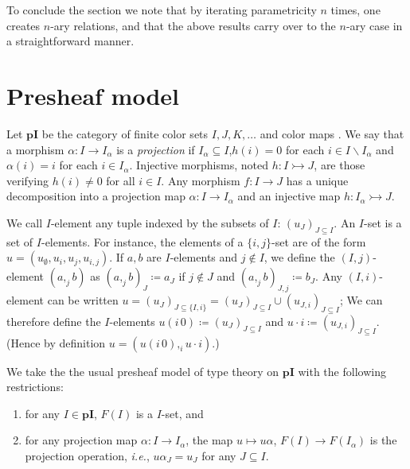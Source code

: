 \documentclass[english]{PaperTools/latex/lipics}
\def\pI{\ensuremath{\mathbf{pI}}}
\def\ie{\textit{i.e.}}
\begin{document}
To conclude the section we note that by iterating parametricity $n$
times, one creates $n$-ary relations, and that the above results carry
over to the $n$-ary case in a straightforward manner.
\section{Presheaf model}

\begin{definition}
  Let \pI{} be the category of finite color sets $I,J,K,…$ and color
  maps \cite[ex.~9.7 p.~176]{PittsAM:nomsns}.
  We say that a morphism $α : I → I_α$ is a \emph{projection} if $I_α ⊆ I$,$h(i) = 0$
  for each $i ∈ I \backslash I_α$ and $α(i) = i$ for each $i ∈ I_α$.
  Injective morphisms, noted $h : I ↣ J$, are those verifying $h(i) ≠ 0$
  for all $i ∈ I$.
  Any morphism $f : I → J$ has a unique decomposition into a projection map
  $α : I → I_α$ and an injective map $h : I_α ↣ J$.

\end{definition}

\begin{definition}
  We call $I$-element any tuple indexed by the subsets of $I$: $(u_J)_{J ⊆ I}$.
  An $I$-set is a set of $I$-elements.  For instance, the elements of a
  $\{i,j\}$-set are of the form $u = (u_∅,u_i,u_j,u_{i,j})$.
  If $a,b$ are $I$-elements and $j ∉ I$, we define the $(I,j)$-element
  $(a ,_j b)$ as $(a ,_j b)_J ≔ a_J$ if $j ∉ J$ and $(a ,_j b)_{J,j} ≔ b_J$.
  Any $(I,i)$-element can be written $u = (u_J)_{J ⊆ \{I,i\}} = (u_J)_{J ⊆ I} ∪ (u_{J,i})_{J ⊆ I}$;
  We can therefore define the $I$-elements $u (i\,0) ≔ (u_J)_{J ⊆ I}$ and $u · i ≔ (u_{J,i})_{J ⊆ I}$.
  (Hence by definition $u = (u (i\,0) ,_i u · i)$.)
\end{definition}

\bigskip
We take the the usual presheaf model of type theory on \pI{} with the
following restrictions:
\begin{enumerate}
  \item for any $I ∈ \pI$, $F(I)$ is a $I$-set, and
  \item for any projection map $α : I → I_α$, the
    map $u ↦ uα$, $F(I) → F(I_α)$ is the projection operation, \ie,
    $uα_J = u_J$ for any $J ⊆ I$.
\end{enumerate}
\end{document}
